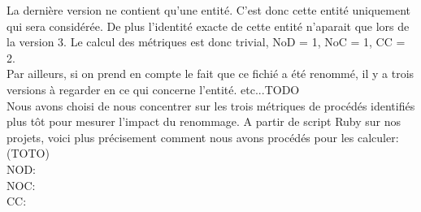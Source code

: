 La dernière version ne contient qu'une entité. C'est donc cette entité uniquement qui sera considérée. De plus l'identité exacte de cette entité n'aparait que lors de la version 3. Le calcul des métriques est donc trivial, NoD = 1, NoC = 1, CC = 2.\\
Par ailleurs, si on prend en compte le fait que ce fichié a été renommé, il y a trois versions à regarder en ce qui concerne l'entité. etc...TODO\\

Nous avons choisi de nous concentrer sur les trois métriques de procédés identifiés plus tôt pour mesurer l'impact du renommage. A partir de script Ruby sur nos projets, voici plus précisement comment nous avons procédés pour les calculer: (TOTO)\\
NOD:\\
NOC:\\
CC:\\ 
